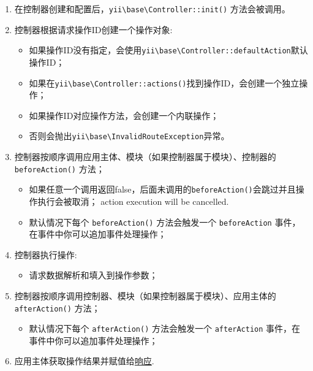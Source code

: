 \begin{enumerate}
\item 在控制器创建和配置后，\texttt{yii{\allowbreak{}\textbackslash}base{\allowbreak{}\textbackslash}Controller\allowbreak{}::\allowbreak{}init()} 方法会被调用。
\item 控制器根据请求操作ID创建一个操作对象:\begin{itemize}
\item 如果操作ID没有指定，会使用\texttt{yii{\allowbreak{}\textbackslash}base{\allowbreak{}\textbackslash}Controller\allowbreak{}::\allowbreak{}defaultAction}默认操作ID；
\item 如果在\texttt{yii{\allowbreak{}\textbackslash}base{\allowbreak{}\textbackslash}Controller\allowbreak{}::\allowbreak{}actions()}找到操作ID，会创建一个独立操作；
\item 如果操作ID对应操作方法，会创建一个内联操作；
\item 否则会抛出\texttt{yii{\allowbreak{}\textbackslash}base{\allowbreak{}\textbackslash}InvalidRouteException}异常。
\end{itemize}

\item 控制器按顺序调用应用主体、模块（如果控制器属于模块）、控制器的 \lstinline|beforeAction()| 方法；\begin{itemize}
\item 如果任意一个调用返回false，后面未调用的\lstinline|beforeAction()|会跳过并且操作执行会被取消；
action execution will be cancelled.
\item 默认情况下每个 \lstinline|beforeAction()| 方法会触发一个 \lstinline|beforeAction| 事件，在事件中你可以追加事件处理操作；
\end{itemize}

\item 控制器执行操作:\begin{itemize}
\item 请求数据解析和填入到操作参数；
\end{itemize}

\item 控制器按顺序调用控制器、模块（如果控制器属于模块）、应用主体的 \lstinline|afterAction()| 方法；\begin{itemize}
\item 默认情况下每个 \lstinline|afterAction()| 方法会触发一个 \lstinline|afterAction| 事件，在事件中你可以追加事件处理操作；
\end{itemize}

\item 应用主体获取操作结果并赋值给\hyperref[runtime-responses.md]{响应}.
\end{enumerate}
